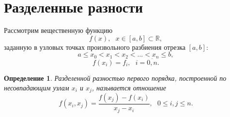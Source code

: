 \documentclass[11pt,a4paper,twoside,listtotoc,bibtotoc]{report}
\numberwithin{equation}{section}
\newtheorem*{definition}{Определение}
\theoremstyle{definition}
\theoremstyle{plain}
\begin{document}
\section{Разделенные разности}
%
Рассмотрим вещественную функцию
%
$$
    f(x), ~~~x\in[a,b]\subset\mathbb{R},
$$
%
заданную в узловых точках произвольного разбиения отрезка $[a,b]$:
%
$$
    a\leqslant x_0<x_1<x_2<\ldots<x_n\leqslant b,
$$
%
%
$$
    f(x_i) = f_i, ~~~ i=\overline{0, n}.
$$
%
\begin{definition}
%
    Разделенной разностью первого порядка, построенной по несовпадающим узлам
    $x_i$ и $x_j$, называется отношение
    \begin{equation}
        \label{div_dif_1}
        f(x_i, x_j)=\frac{f(x_j) - f(x_i)}{x_j - x_i},
        ~~~0 \leqslant i,j \leqslant n.
    \end{equation}
%
\end{definition}
%
\end{document}
